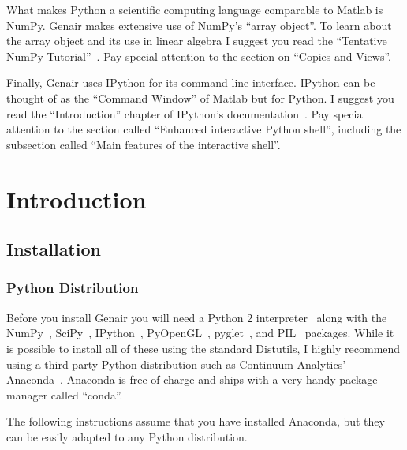 \documentclass[]{article}
\begin{document}
What makes Python a scientific computing language comparable to Matlab 
is NumPy.  Genair makes extensive use of NumPy's ``array object''.  To 
learn about the array object and its use in linear algebra I suggest you 
read the ``Tentative NumPy Tutorial''~\cite{numpy}.  Pay special 
attention to the section on ``Copies and Views''.

Finally, Genair uses IPython for its command-line interface.  IPython 
can be thought of as the ``Command Window'' of Matlab but for Python.  I 
suggest you read the ``Introduction'' chapter of IPython's 
documentation~\cite{ipython}.  Pay special attention to the section 
called ``Enhanced interactive Python shell'', including the subsection 
called ``Main features of the interactive shell''.


\section{Introduction}

\subsection{Installation}

\subsubsection{Python Distribution}
\label{subsubsec:anaconda}

Before you install Genair you will need a Python 2 
interpreter~\cite{python} along with the NumPy~\cite{numpy}, 
SciPy~\cite{scipy}, IPython~\cite{ipython}, PyOpenGL~\cite{pyopengl}, 
pyglet~\cite{pyglet}, and PIL~\cite{pil} packages.  While it is possible 
to install all of these using the standard Distutils, I highly recommend 
using a third-party Python distribution such as Continuum Analytics' 
Anaconda~\cite{anaconda}.  Anaconda is free of charge and ships with a 
very handy package manager called ``conda''.

The following instructions assume that you have installed Anaconda, but 
they can be easily adapted to any Python distribution.
\end{document}
